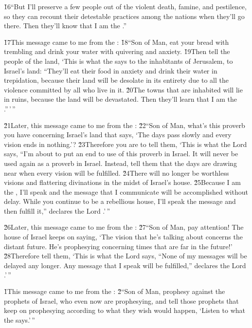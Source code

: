 \v{16}``But I'll preserve a few people out of the violent death, famine, and pestilence, so they can recount their detestable practices among the nations when they'll go there. Then they'll know that I am the .''

\v{17}This message came to me from the : \v{18}``Son of Man, eat your bread with trembling and drink your water with quivering and anxiety. \v{19}Then tell the people of the land, `This is what the  says to the inhabitants of Jerusalem, to Israel's land: ``They'll eat their food in anxiety and drink their water in trepidation, because their land will be desolate in its entirety due to all the violence committed by all who live in it. \v{20}The towns that are inhabited will lie in ruins, because the land will be devastated. Then they'll learn that I am the .''\,'\,''

\v{21}Later, this message came to me from the : \v{22}``Son of Man, what's this proverb you have concerning Israel's land that says, `The days pass slowly and every vision ends in nothing.'? \v{23}Therefore you are to tell them, `This is what the Lord  says, ``I'm about to put an end to use of this proverb in Israel. It will never be used again as a proverb in Israel. Instead, tell them that the days are drawing near when every vision will be fulfilled. \v{24}There will no longer be worthless visions and flattering divinations in the midst of Israel's house. \v{25}Because I am the , I'll speak and the message that I communicate will be accomplished without delay. While you continue to be a rebellious house, I'll speak the message and then fulfill it,'' declares the Lord .'\,''

\v{26}Later, this message came to me from the : \v{27}``Son of Man, pay attention! The house of Israel keeps on saying, `The vision that he's talking about concerns the distant future. He's prophesying concerning times that are far in the future!' \v{28}Therefore tell them, `This is what the Lord  says, ``None of my messages will be delayed any longer. Any message that I speak will be fulfilled,'' declares the Lord .'\,''

\v{1}This message came to me from the : \v{2}``Son of Man, prophesy against the prophets of Israel, who even now are prophesying, and tell those prophets that keep on prophesying according to what they wish would happen, `Listen to what the  says.'\,''

